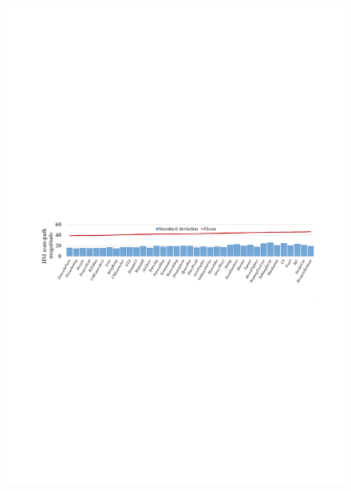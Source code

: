 \documentclass[10pt,journal,compsoc]{IEEEtran}
\begin{document}
\begin{figure}
	\begin{center}
		\centerline{\includegraphics[width=2\columnwidth]{figures/database/consistence-magnitude1}}
	\end{center}
\end{figure}
\vspace{-1.0em}
\end{document}
